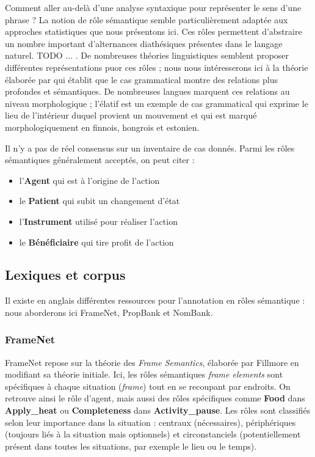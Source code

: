 Comment aller au-delà d'une analyse syntaxique pour représenter le sens d'une
phrase ? La notion de rôle sémantique semble particulièrement adaptée aux
approches statistiques que nous présentons ici. Ces rôles permettent
d'abstraire un nombre important d'alternances diathésiques présentes dans le
langage naturel. TODO ... . De nombreuses théories linguistiques semblent
proposer différentes représentations puor ces rôles ; nous nous intéresserons
ici à la théorie élaborée par \cite{fillmore1968case} qui établit que le cas
grammatical montre des relations plus profondes et sémantiques. De nombreuses
langues marquent ces relations au niveau morphologique ; l'élatif est un
exemple de cas grammatical qui exprime le lieu de l'intérieur duquel provient
un mouvement et qui est marqué morphologiquement en finnois, hongrois et
estonien.

Il n'y a pas de réel consensus sur un inventaire de cas donnés. Parmi les rôles
sémantiques généralement acceptés, on peut citer :

\begin{itemize}
    \item l'\textbf{Agent} qui est à l'origine de l'action
    \item le \textbf{Patient} qui subit un changement d'état
    \item l'\textbf{Instrument} utilisé pour réaliser l'action
    \item le \textbf{Bénéficiaire} qui tire profit de l'action
\end{itemize}

\subsection{Lexiques et corpus}

Il existe en anglais différentes ressources pour l'annotation en rôles
sémantique : nous aborderons ici FrameNet, PropBank et NomBank.

\subsubsection{FrameNet}

FrameNet repose sur la théorie des \textit{Frame Semantics}, élaborée par
Fillmore en modifiant sa théorie initiale. Ici, les rôles sémantiques
\textit{frame elements} sont spécifiques à chaque situation (\textit{frame})
tout en se recoupant par endroits. On retrouve ainsi le rôle d'agent, mais
aussi des rôles spécifiques comme \textbf{Food} dans \textbf{Apply\_heat} ou
\textbf{Completeness} dans \textbf{Activity\_pause}. Les rôles sont classifiés
selon leur importance dans la situation : centraux (nécessaires), périphériques
(toujours liés à la situation mais optionnels) et circonstanciels
(potentiellement présent dans toutes les situations, par exemple le lieu ou le
temps).

